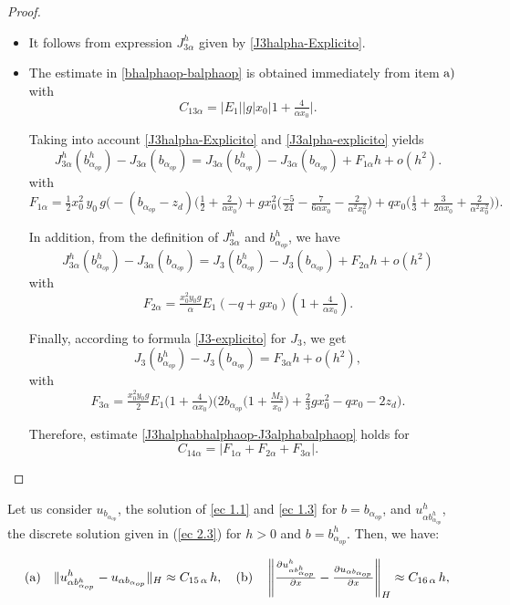 \documentclass[axioms,article,submit,moreauthors]{Definitions/mdpi}
\newcommand\pder[2][]{\ensuremath{\tfrac{\partial#1}{\partial#2}}}
\begin{document}
\begin{proof} $ $
\begin{itemize}
\item[(a)] It follows from expression ${J^h_{3\alpha}}$ given by \eqref{J3halpha-Explicito}.

\item[(b)] The estimate in \eqref{bhalphaop-balphaop} is obtained immediately from item $\rm{a)}$ with \[C_{13\alpha}=|E_1| |g| x_0  \Big\lvert 1+\tfrac{4}{\alpha x_0}\Big\rvert.\]

Taking into account \eqref{J3halpha-Explicito} and \eqref{J3alpha-explicito} yields 
\[{J^h_{3\alpha}}({b^h_{\alpha_{op}}})-J_{3\alpha}(b_{\alpha_{op}})=J_{3\alpha}({b^h_{\alpha_{op}}})-J_{3\alpha}(b_{\alpha_{op}})+F_{1\alpha}h+o(h^2).\]
with \[F_{1\alpha}=\tfrac{1}{2} x_0^2\,y_0 \,g\Big(- (b_{\alpha_{op}}-z_d) \Big(  \tfrac{1}{2} + \tfrac{2}{\alpha x_0}  \Big)
  + g x_0^2 \Big( \tfrac{-5 }{24} -  \tfrac{7 }{6 \alpha x_0} -  \tfrac{2 }{\alpha^2 x_0^2} \Big)
  + q x_0\Big(  \tfrac{1}{3} +  \tfrac{3 }{2 \alpha x_0} +  \tfrac{2}{\alpha^2 x_0^2}\Big) \Big).\]

In addition, from  the definition of ${ J^h_{3\alpha}}$ and ${b^h_{\alpha_{op}}}$, we have
\[{ J^h_{3\alpha}}({b^h_{\alpha_{op}}})-J_{3\alpha}(b_{\alpha_{op}})=J_3({b^h_{\alpha_{op}}})-J_3(b_{\alpha_{op}})+F_{2\alpha}h+o(h^2)\]
with \[ F_{2\alpha}=\tfrac{x_0^2 y_0 g}{\alpha} E_1 (-q+gx_0)\left( 1+\tfrac{4}{\alpha x_0}\right).\]

Finally, according to formula \eqref{J3-explicito} for $J_3$, we get 
\[J_3({b^h_{\alpha_{op}}})-J_3(b_{\alpha_{op}})=F_{3\alpha}h+o(h^2),\]
with  \[F_{3\alpha}=\tfrac{x_0^2 y_0 g }{2} E_1 \Big( 1+\tfrac{4}{\alpha x_0}\Big)  \Big( 2b_{\alpha_{op}} \Big(1+ \tfrac{M_3}{x_0} \Big)+\tfrac{2}{3} g x_0^2-q x_0-2 z_d\Big).\]

Therefore,  estimate \eqref{J3halphabhalphaop-J3alphabalphaop} holds for 
\[
C_{14\alpha}=\Big\lvert F_{1\alpha}+F_{2\alpha}+F_{3\alpha}\Big\rvert. \]
\end{itemize}
\end{proof}

\begin{Lemma} Let us consider $u_{b_{\alpha_{op}}}$, the solution of \eqref{ec 1.1} and \eqref{ec 1.3} for $b= b_{\alpha_{op}}$, and
		${u^h_{\alpha b^h_{\alpha_{op}}}}$, the discrete solution  given in (\ref{ec 2.3}) for  $h>0$ and $b={b^h_{\alpha_{op}}}.$ Then, we have:
						
	 \begin{equation}  \label{difu-problema3alpha} {\rm (a)} \quad  			      
  				  \lVert {u^h_{\alpha b^h_{\alpha_{op}}}} - u_{\alpha b_{\alpha_{op}}}  \rVert _H \approx C_{15\,\alpha}\, h,
 \quad
     {\rm (b)}\quad
        \left\lVert \pder[{u^h_{\alpha b^h_{\alpha_{op}}}}]{x} - \pder[u_{\alpha b_{\alpha_{op}}}]{x} \right\rVert _H \approx C_{16\, \alpha} \,h,
\end{equation}
   \end{Lemma}
   
\end{document}
